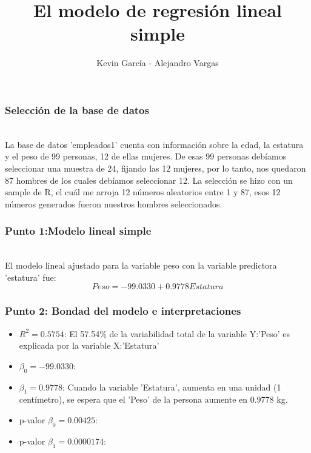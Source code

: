 \documentclass[12pt]{beamer}
\author{Kevin García - Alejandro Vargas}
\title{El modelo de regresión lineal simple}
\begin{document}
\begin{frame}
\titlepage
\end{frame}

\begin{frame}
\frametitle{Selección de la base de datos}
~\\La base de datos 'empleados1' cuenta con información sobre la edad, la estatura y el peso
de 99 personas, 12 de ellas mujeres. De esas 99 personas debíamos seleccionar una muestra de 24, fijando las 12 mujeres, por lo tanto, nos quedaron 87 hombres de los cuales debíamos seleccionar 12. La selección se hizo con un sample de R, el cuál me arroja 12 números aleatorios entre 1 y 87, esos 12 números generados fueron nuestros hombres seleccionados.
\end{frame}

\begin{frame}
\frametitle{Punto 1:Modelo lineal simple}
~\\ El modelo lineal ajustado para la variable peso con la variable predictora 'estatura' fue:
~\\ $$Peso=-99.0330+0.9778 Estatura$$

\end{frame}

\begin{frame}
\frametitle{Punto 2: Bondad del modelo e interpretaciones}
\begin{itemize}
\item $R^2=0.5754$: El 57.54\% de la variabilidad total de la variable Y:'Peso' es explicada por la variable X:'Estatura'
\item $\beta_{0}=-99.0330$:
\item $\beta_{1}=0.9778$: Cuando la variable 'Estatura', aumenta en una unidad (1 centímetro), se espera que el 'Peso' de la persona aumente en 0.9778 kg.
\item p-valor $\beta_{0}=0.00425$: 
\item p-valor $\beta_{1}=0.0000174$:
\end{itemize}
\end{frame}
\end{document}
